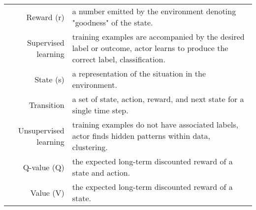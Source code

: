 \begin{longtable}{@{}rY@{}}
	Reward (r) & a number emitted by the environment denoting "goodness" of the state. \\
	Supervised learning & training examples are accompanied by the desired label or outcome, actor learns to produce the correct label, classification. \\
	State (s) & a representation of the situation in the environment. \\
	Transition & a set of state, action, reward, and next state for a single time step. \\
	Unsupervised learning & training examples do not have associated labels, actor finds hidden patterns within data, clustering.  \\
	Q-value (Q) & the expected long-term discounted reward of a state and action. \\
	Value (V) & the expected long-term discounted reward of a state. \\
	\bottomrule 
\end{longtable} 
